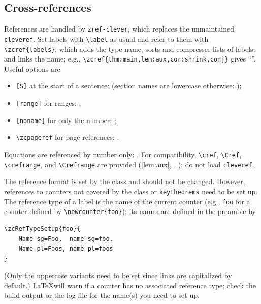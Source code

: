 \documentclass[english,review]{jnsao}
\newcommand{\cs}[1]{\texttt{\textbackslash#1}}
\newcommand{\pkg}[1]{\texttt{#1}}
\begin{document}
\subsection{Cross-references}\label{sec:references}

References are handled by \pkg{zref-clever}, which replaces the unmaintained \pkg{cleveref}. Set labels with \cs{label} as usual and refer to them with \verb!\zcref{labels}!, which adds the type name, sorts and compresses lists of labels, and links the name; e.g., \verb!\zcref{thm:main,lem:aux,cor:shrink,conj}! gives ``''. Useful options are
\begin{itemize}
    \item \texttt{[S]} at the start of a sentence:  (section names are lowercase otherwise: );
    \item \texttt{[range]} for ranges: ;
    \item \texttt{[noname]} for only the number: ;
    \item \cs{zcpageref} for page references: .
\end{itemize}
Equations are referenced by number only: . For compatibility, \cs{cref}, \cs{Cref}, \cs{crefrange}, and \cs{Crefrange} are provided (\cref{lem:aux}, , ); do not load \pkg{cleveref}.

The reference format is set by the class and should not be changed. However, references to counters not covered by the class or \pkg{keytheorems} need to be set up. The reference type of a label is the name of the current counter (e.g., \texttt{foo} for a counter defined by \verb!\newcounter{foo}!); its names are defined in the preamble by
\begin{verbatim}
\zcRefTypeSetup{foo}{
    Name-sg=Foo,  name-sg=foo,
    Name-pl=Foos, name-pl=foos
}
\end{verbatim}
(Only the uppercase variants need to be set since links are capitalized by default.) \LaTeX will warn if a counter has no associated reference type; check the build output or the log file for the name(s) you need to set up.
\end{document}
